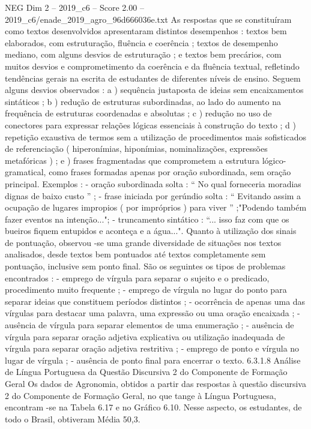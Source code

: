 \begin{textsample}{NEG Dim 2 – 2019\_c6 – Score 2.00 – 2019\_c6/enade\_2019\_agro\_96d666036e.txt}
As respostas que se constituíram como textos desenvolvidos apresentaram distintos desempenhos : textos bem elaborados, com estruturação, fluência e coerência ; textos de desempenho mediano, com alguns desvios de estruturação ; e textos bem precários, com muitos desvios e comprometimento da coerência e da fluência textual, refletindo tendências gerais na escrita de estudantes de diferentes níveis de ensino.
Seguem alguns desvios observados : a ) sequência justaposta de ideias sem encaixamentos sintáticos ; b ) redução de estruturas subordinadas, ao lado do aumento na frequência de estruturas coordenadas e absolutas ; c ) redução no uso de conectores para expressar relações lógicas essenciais à construção do texto ; d ) repetição exaustiva de termos sem a utilização de procedimentos mais sofisticados de referenciação ( hiperonímias, hiponímias, nominalizações, expressões metafóricas ) ; e ) frases fragmentadas que comprometem a estrutura lógico-gramatical, como frases formadas apenas por oração subordinada, sem oração principal.
Exemplos : - oração subordinada solta : “ No qual forneceria moradias dignas de baixo custo ” ; - frase iniciada por gerúndio solta : “ Evitando assim a ocupação de lugares impropios ( por impróprios ) para viver ” ;"Podendo também fazer eventos na intenção..."; - truncamento sintático : “... isso faz com que os bueiros fiquem entupidos e aconteça e a água...".
Quanto à utilização dos sinais de pontuação, observou -se uma grande diversidade de situações nos textos analisados, desde textos bem pontuados até textos completamente sem pontuação, inclusive sem ponto final.
São os seguintes os tipos de problemas encontrados : - emprego de vírgula para separar o sujeito e o predicado, procedimento muito frequente ; - emprego de vírgula no lugar do ponto para separar ideias que constituem períodos distintos ; - ocorrência de apenas uma das vírgulas para destacar uma palavra, uma expressão ou uma oração encaixada ; - ausência de vírgula para separar elementos de uma enumeração ; - ausência de vírgula para separar oração adjetiva explicativa ou utilização inadequada de vírgula para separar oração adjetiva restritiva ; - emprego de ponto e vírgula no lugar de vírgula ; - ausência de ponto final para encerrar o texto. 6.3.1.8 Análise de Língua Portuguesa da Questão Discursiva 2 do Componente de Formação Geral Os dados de Agronomia, obtidos a partir das respostas à questão discursiva 2 do Componente de Formação Geral, no que tange à Língua Portuguesa, encontram -se na Tabela 6.17 e no Gráfico 6.10.
Nesse aspecto, os estudantes, de todo o Brasil, obtiveram Média 50,3.

\end{textsample}
